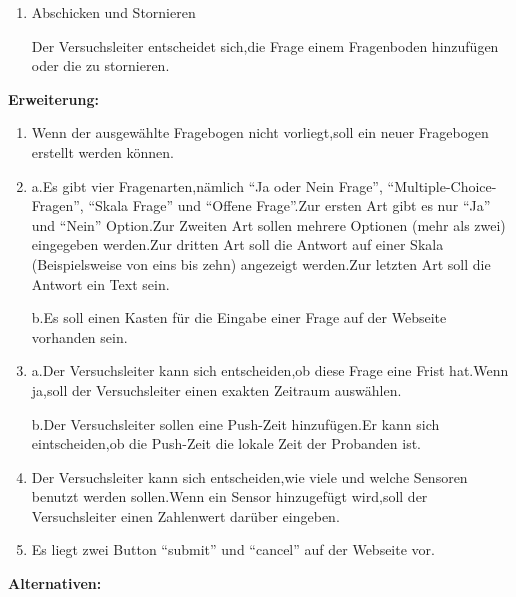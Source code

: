 \documentclass[a4paper]{scrreprt}
\begin{document}
\begin{itemize}
\begin{enumerate}
                            \item Abschicken und Stornieren
                            \par Der Versuchsleiter entscheidet sich,die Frage einem Fragenboden hinzufügen oder die zu stornieren.
		            	\end{enumerate}
	            	\par \textbf{Erweiterung: }
                            \begin{enumerate}
                            \item Wenn der ausgewählte Fragebogen nicht vorliegt,soll ein neuer Fragebogen erstellt werden können.
                            \item a.Es gibt vier Fragenarten,nämlich ``Ja oder Nein Frage'', ``Multiple-Choice-Fragen'', ``Skala Frage'' und ``Offene Frage''.Zur ersten Art gibt es nur ``Ja'' und ``Nein'' Option.Zur Zweiten Art sollen mehrere Optionen (mehr als zwei) eingegeben werden.Zur dritten Art soll die Antwort  auf einer Skala (Beispielsweise von eins bis zehn) angezeigt werden.Zur letzten Art soll die Antwort ein Text sein.
                                \par b.Es soll einen Kasten für die Eingabe einer Frage auf der Webseite vorhanden sein.
                            \item a.Der Versuchsleiter kann sich entscheiden,ob diese Frage eine Frist hat.Wenn ja,soll der Versuchsleiter  einen exakten Zeitraum auswählen.
                                \par b.Der Versuchsleiter sollen eine Push-Zeit hinzufügen.Er kann sich eintscheiden,ob die Push-Zeit die lokale Zeit der Probanden ist.
                            \item Der Versuchsleiter kann sich entscheiden,wie viele und welche Sensoren benutzt werden sollen.Wenn ein Sensor hinzugefügt wird,soll der Versuchsleiter einen Zahlenwert dar\"uber eingeben.
                            \item Es liegt zwei Button ``submit'' und ``cancel'' auf der Webseite vor.
                            \end{enumerate}
	            	\par \textbf{Alternativen: }
	

\end{itemize}
\end{document}
